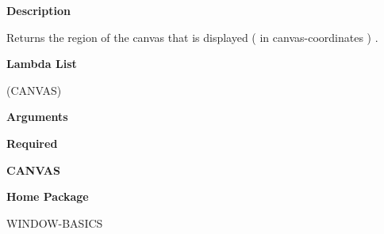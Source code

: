  
{\bf Description}

Returns the region of the canvas that is displayed ( in canvas-coordinates ) .

 
{\bf Lambda List}

(CANVAS)

 
{\bf Arguments}


\beginhang
{\bf Required}\hspace{2em}
 
{\bf CANVAS}


 
\endhang
 
{\bf Home Package}

WINDOW-BASICS

